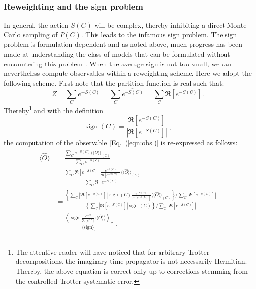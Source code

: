 \subsubsection{Reweighting and the sign problem}\label{sec:reweight}

In general, the action  $S(C) $ will be complex, thereby inhibiting a direct Monte Carlo sampling of $P(C)$.   This leads to the infamous sign problem.     The sign problem is formulation dependent and as noted above, much progress has been made at understanding the class of models that  can be formulated without encountering this problem 
\cite{Wu04,Huffman14,Yao14a,Wei16}.  When the average sign is not too small, we can nevertheless  compute observables within a reweighting scheme.   Here we adopt the following scheme. First  note  that the partition function is real such that: 
\begin{equation}
	Z =   \sum_{C}  e^{-S(C)}    =  \sum_{C}  \overline{e^{-S(C)}} = \sum_{C}  \Re \left[e^{-S(C)} \right]. 
\end{equation}
Thereby\footnote{The attentive reader will have noticed that   for arbitrary Trotter decompositions,  the  imaginary time propagator is not necessarily Hermitian. Thereby, the above equation is correct only up to corrections stemming from the  controlled Trotter systematic error. }
and with the definition
\begin{equation}
\label{Sign.eq}
	 \text{ sign }(C)   =  \frac{   \Re \left[e^{-S(C)} \right]  } {\left| \Re \left[e^{-S(C)} \right]  \right|  }\;,
\end{equation}
the computation of the observable [Eq.~(\ref{eqn:obs})] is re-expressed as follows:
\begin{align}\label{eqn:obs_rw}
\langle \hat{O}  \rangle  &=  \frac{\sum_{C}  e^{-S(C)} \langle \langle \hat{O}  \rangle \rangle_{(C)} }{\sum_{C}  e^{-S(C)}}       \nonumber \\ 
                          &=  \frac{\sum_{C}   \Re \left[e^{-S(C)} \right]    \frac{e^{-S(C)}} {\Re \left[e^{-S(C)} \right]}  \langle \langle \hat{O}  \rangle \rangle_{(C)} }{\sum_{C}   \Re \left[e^{-S(C)} \right]}    \nonumber \\ 
          &=
   \frac{
     \left\{
      \sum_{C}  \left| \Re \left[e^{-S(C)} \right]  \right|   \text{ sign }(C)   \frac{e^{-S(C)}} {\Re \left[e^{-S(C)} \right]}  \langle \langle \hat{O}  \rangle \rangle_{(C)}  \right\}/
            \sum_{C}  \left| \Re \left[ e^{-S(C)} \right] \right|  
          }  
          { 
          \left\{ \sum_{C}  \left|  \Re \left[ e^{-S(C)} \right]   \right|   \text{ sign }(C) \right\}/
            \sum_{C}   \left| \Re \left[ e^{-S(C)} \right] \right|  
          } \nonumber\\
          &=
  	 \frac{  \left\langle  \text{ sign }   \frac{e^{-S}} {\Re \left[e^{-S} \right]}  \langle \langle \hat{O}  \rangle \rangle  \right\rangle_{\overline{P}} } { \langle \text{sign}   \rangle_{\overline{P}}}  \;.      
\end{align} 
